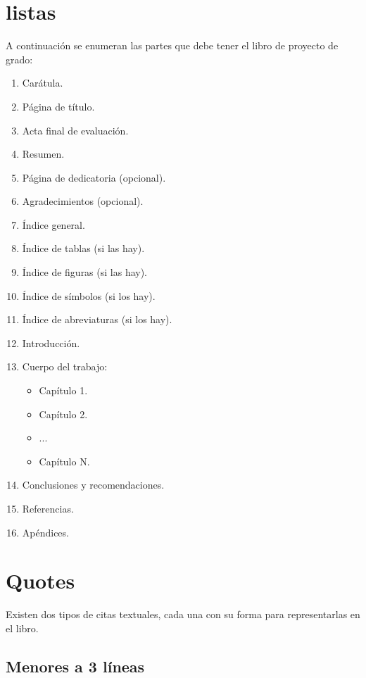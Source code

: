 \section{listas}

A continuación se enumeran las partes que debe tener el libro de proyecto de grado:

\begin{enumerate}
    \item Carátula.
    \item Página de título.
    \item Acta final de evaluación.
    \item Resumen.
    \item Página de dedicatoria (opcional).
    \item Agradecimientos (opcional).
    \item Índice general.
    \item Índice de tablas (si las hay).
    \item Índice de figuras (si las hay).
    \item Índice de símbolos (si los hay).
    \item Índice de abreviaturas (si los hay).
    \item Introducción.
    \item Cuerpo del trabajo:
    \begin{itemize}
        \item Capítulo 1.
        \item Capítulo 2.
        \item ...
        \item Capítulo N.
    \end{itemize}
    \item Conclusiones y recomendaciones.
    \item Referencias.
    \item Apéndices.
\end{enumerate}

\section{Quotes}

Existen dos tipos de citas textuales, cada una con su forma para representarlas en el libro.

\subsection{Menores a 3 líneas}

